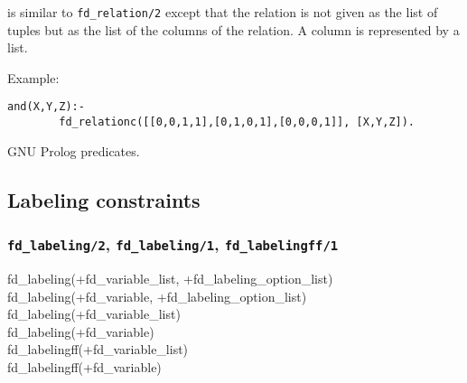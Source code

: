  is similar to \texttt{fd\_relation/2}
except that the relation is not given as the list of tuples but as the list
of the columns of the relation. A column is represented by a list.

Example:

\begin{Indentation}
\begin{verbatim}
and(X,Y,Z):-
        fd_relationc([[0,0,1,1],[0,1,0,1],[0,0,0,1]], [X,Y,Z]).
\end{verbatim}
\end{Indentation}

\begin{PlErrors}







\end{PlErrors}

\Portability

GNU Prolog predicates.

\subsection{Labeling constraints}

\subsubsection{\texttt{fd\_labeling/2},
\texttt{fd\_labeling/1},
\texttt{fd\_labelingff/1}}
\label{fd-labeling/2}

\begin{TemplatesOneCol}
fd\_labeling(+fd\_variable\_list, +fd\_labeling\_option\_list)\\
fd\_labeling(+fd\_variable, +fd\_labeling\_option\_list)\\
fd\_labeling(+fd\_variable\_list)\\
fd\_labeling(+fd\_variable)\\
fd\_labelingff(+fd\_variable\_list)\\
fd\_labelingff(+fd\_variable)

\end{TemplatesOneCol}

